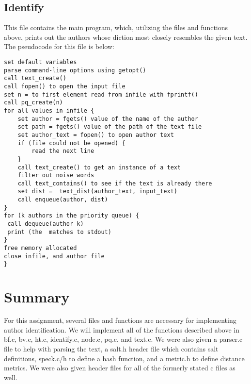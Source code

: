 \documentclass[11pt]{article}
\begin{document}
\subsection{Identify}
 This file contains the main program, which, utilizing the files and functions above, prints out the authors whose diction most closely resembles the given text. The pseudocode for this file is below:


\begin{verbatim}
set default variables
parse command-line options using getopt()
call text_create()
call fopen() to open the input file
set n = to first element read from infile with fprintf()
call pq_create(n)
for all values in infile {
    set author = fgets() value of the name of the author
    set path = fgets() value of the path of the text file
    set author_text = fopen() to open author text
    if (file could not be opened) {
        read the next line
    }
    call text_create() to get an instance of a text
    filter out noise words
    call text_contains() to see if the text is already there
    set dist =  text_dist(author_text, input_text)
    call enqueue(author, dist)
}
for (k authors in the priority queue) {
 call dequeue(author k)
 print (the  matches to stdout)
}
free memory allocated
close infile, and author file 
}
\end{verbatim}
\section{Summary}
For this assignment, several files and functions are necessary for implementing author identification. We will implement all of the functions described above in bf.c, bv.c, ht.c, identify.c, node.c, pq.c, and text.c. We were also given a parser.c file to help with parsing the text, a salt.h header file which contains salt definitions, speck.c/h to define a hash function, and a metric.h to define distance metrics. We were also given header files for all of the formerly stated c files as well.
\end{document}
